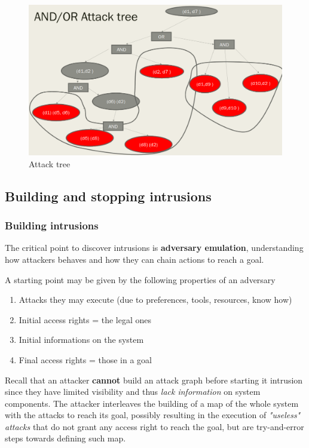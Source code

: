 \begin{figure}[htbp]
   \centering
   \includegraphics{images/attack_tree.png}
   \caption{Attack tree}
   \label{fig:attack_tree}
\end{figure}


\subsection{Building and stopping intrusions}
\subsubsection{Building intrusions}
The critical point to discover intrusions is \textbf{adversary emulation},
understanding how
attackers behaves and how they can chain actions to reach a goal.

A starting point may be given by the following properties of an adversary
\begin{enumerate}
   \item Attacks they may execute (due to preferences, tools, resources, know how)
   \item Initial access rights = the legal ones
   \item Initial informations on the system
   \item Final access rights = those in a goal
\end{enumerate}

Recall that an attacker \textbf{cannot} build an attack graph before starting it intrusion
since they have limited
visibility and thus \textit{lack information} on system components.
The attacker interleaves the building of a map of the whole
system with the attacks to reach its goal,
possibly resulting in the execution of \textit{"useless" attacks} that
do not grant any access right to reach the goal,
but are try-and-error steps towards defining such map.

